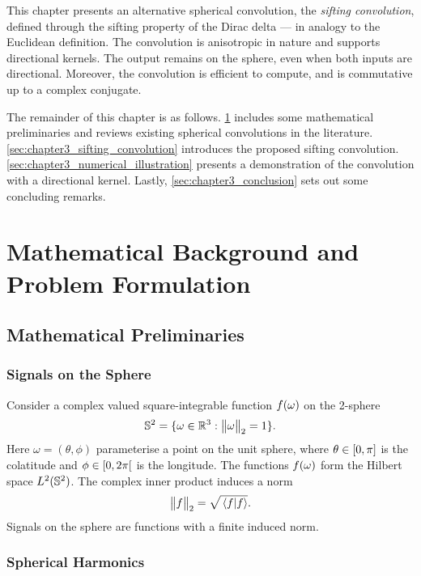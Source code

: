 This chapter presents an alternative spherical convolution, the \emph{sifting convolution}, defined through the sifting property of the Dirac delta --- in analogy to the Euclidean definition.
The convolution is anisotropic in nature and supports directional kernels.
The output remains on the sphere, even when both inputs are directional.
Moreover, the convolution is efficient to compute, and is commutative up to a complex conjugate.

The remainder of this chapter is as follows.
\cref{sec:chapter3_preliminaries} includes some mathematical preliminaries and reviews existing spherical convolutions in the literature.
\cref{sec:chapter3_sifting_convolution} introduces the proposed sifting convolution.
\cref{sec:chapter3_numerical_illustration} presents a demonstration of the convolution with a directional kernel.
Lastly, \cref{sec:chapter3_conclusion} sets out some concluding remarks.

\section{Mathematical Background and Problem Formulation}\label{sec:chapter3_preliminaries}

\subsection{Mathematical Preliminaries}

\subsubsection{Signals on the Sphere}

Consider a complex valued square-integrable function \(f(\omega)\) on the 2-sphere
%
\begin{equation}
	\mathbb{S}^{2}{}
	= \{\omega \in \mathbb{R}^{3} : {\big\lVert\omega\big\rVert}_{2} = 1\}.
\end{equation}
%
Here \(\omega=(\theta,\phi)\) parameterise a point on the unit sphere, where \(\theta \in \interval{0}{\pi}\) is the colatitude and \(\phi \in \interval[open right]{0}{2\pi}\) is the longitude.
The functions \(f(\omega)\) form the Hilbert space \(L^{2}(\mathbb{S}^{2})\).
The complex inner product induces a norm
%
\begin{equation}
	{\big\lVert f\big\rVert}_{2}
	= \sqrt{\braket*{f}}.
\end{equation}
%
Signals on the sphere are functions with a finite induced norm.

\subsubsection{Spherical Harmonics}

